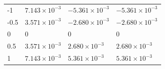\begin{tabular}{llll}
-1 & $7.143\times10^{-3}$ & $-5.361\times10^{-3}$ & $-5.361\times10^{-3}$ \\
-0.5 & $3.571\times10^{-3}$ & $-2.680\times10^{-3}$ & $-2.680\times10^{-3}$ \\
0 & $0$ & $0$ & $0$ \\
0.5 & $3.571\times10^{-3}$ & $2.680\times10^{-3}$ & $2.680\times10^{-3}$ \\
1 & $7.143\times10^{-3}$ & $5.361\times10^{-3}$ & $5.361\times10^{-3}$ \\
\end{tabular}
